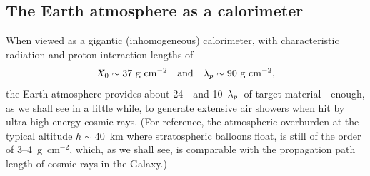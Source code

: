 \subsection{The Earth atmosphere as a calorimeter}
\label{sec:atmosphere_calorimeter}

\begin{marginfigure}
  
  \caption{Longitudinal profile of the Earth atmosphere, when viewed as a
  calorimeter (from the top). The two leftmost axes represent the total grammage
  above any given altitude expressed in radiation lengths and proton
  interaction lengths, calculated inverting~\eqref{eq:atmospheric_grammage}.}
  \label{fig:atmospheric_scales}
\end{marginfigure}

When viewed as a gigantic (inhomogeneous) calorimeter, with characteristic
radiation and proton interaction lengths of
\begin{align*}
  X_0 \sim 37~\text{g~cm}^{-2}
  \quad\text{and}\quad
  \lambda_p \sim 90~\text{g~cm}^{-2},
\end{align*}
the Earth atmosphere provides about 24~\radlength~and 10~$\lambda_p$~of target
material---enough, as we shall see in a little while, to generate extensive air
showers when hit by ultra-high-energy cosmic rays.
(For reference, the atmospheric overburden at the typical altitude $h \sim 40$~km
where stratospheric balloons float, is still of the order of 3--4~g~cm$^{-2}$, which,
as we shall see, is comparable with the propagation path length of cosmic rays in
the Galaxy.)


\begin{marginfigure}
  
  \caption{\cherenkov~energy threshold for electrons and maximum \cherenkov~angle
  as a function of the altitude.}
  \label{fig:atmospheric_cherenkov}
\end{marginfigure}

